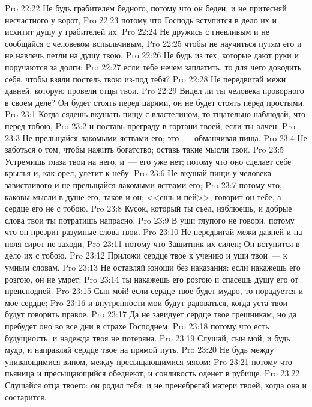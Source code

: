 \rsbpar\vs Pro 22:22 Не будь грабителем бедного, потому что он беден, и не притесняй несчастного у ворот,
\vs Pro 22:23 потому что Господь вступится в дело их и исхитит душу у грабителей их.
\vs Pro 22:24 Не дружись с гневливым и не сообщайся с человеком вспыльчивым,
\vs Pro 22:25 чтобы не научиться путям его и не навлечь петли на душу твою.
\vs Pro 22:26 Не будь из тех, которые дают руки и поручаются за долги:
\vs Pro 22:27 если тебе нечем заплатить, то для чего доводить себя, чтобы взяли постель твою из-под тебя?
\vs Pro 22:28 Не передвигай межи давней, которую провели отцы твои.
\vs Pro 22:29 Видел ли ты человека проворного в своем деле? Он будет стоять перед царями, он не будет стоять перед простыми.
\vs Pro 23:1 Когда сядешь вкушать пищу с властелином, то тщательно наблюдай, что перед тобою,
\vs Pro 23:2 и поставь преграду в гортани твоей, если ты алчен.
\vs Pro 23:3 Не прельщайся лакомыми яствами его; это~--- обманчивая пища.
\vs Pro 23:4 Не заботься о том, чтобы нажить богатство; оставь такие мысли твои.
\vs Pro 23:5 Устремишь глаза твои на него, и~--- его уже нет; потому что оно сделает себе крылья и, как орел, улетит к небу.
\vs Pro 23:6 Не вкушай пищи у человека завистливого и не прельщайся лакомыми яствами его;
\vs Pro 23:7 потому что, каковы мысли в душе его, таков и он; <<ешь и пей>>, говорит он тебе, а сердце его не с тобою.
\vs Pro 23:8 Кусок, который ты съел, изблюешь, и добрые слова твои ты потратишь напрасно.
\vs Pro 23:9 В уши глупого не говори, потому что он презрит разумные слова твои.
\vs Pro 23:10 Не передвигай межи давней и на поля сирот не заходи,
\vs Pro 23:11 потому что Защитник их силен; Он вступится в дело их с тобою.
\vs Pro 23:12 Приложи сердце твое к учению и уши твои~--- к умным словам.
\vs Pro 23:13 Не оставляй юноши без наказания: если накажешь его розгою, он не умрет;
\vs Pro 23:14 ты накажешь его розгою и спасешь душу его от преисподней.
\rsbpar\vs Pro 23:15 Сын мой! если сердце твое будет мудро, то порадуется и мое сердце;
\vs Pro 23:16 и внутренности мои будут радоваться, когда уста твои будут говорить правое.
\vs Pro 23:17 Да не завидует сердце твое грешникам, но да пребудет оно во все дни в страхе Господнем;
\vs Pro 23:18 потому что есть будущность, и надежда твоя не потеряна.
\vs Pro 23:19 Слушай, сын мой, и будь мудр, и направляй сердце твое на прямой путь.
\vs Pro 23:20 Не будь между упивающимися вином, между пресыщающимися мясом:
\vs Pro 23:21 потому что пьяница и пресыщающийся обеднеют, и сонливость оденет в рубище.
\vs Pro 23:22 Слушайся отца твоего: он родил тебя; и не пренебрегай матери твоей, когда она и состарится.
